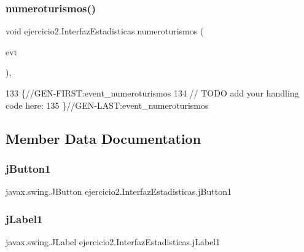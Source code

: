 \subsubsection{\texorpdfstring{numeroturismos()}{numeroturismos()}}
{\footnotesize\ttfamily void ejercicio2.\+Interfaz\+Estadisticas.\+numeroturismos (\begin{DoxyParamCaption}\item[{javax.\+swing.\+event.\+Ancestor\+Event}]{evt }\end{DoxyParamCaption})\hspace{0.3cm}{\ttfamily [inline]}, {\ttfamily [private]}}


\begin{DoxyCode}
133                                                                      \{\textcolor{comment}{//GEN-FIRST:event\_numeroturismos}
134         \textcolor{comment}{// TODO add your handling code here:}
135     \}\textcolor{comment}{//GEN-LAST:event\_numeroturismos}
\end{DoxyCode}


\subsection{Member Data Documentation}
\mbox{\label{classejercicio2_1_1_interfaz_estadisticas_a2e04a5a0eb4f298d827c33c859436a97}} 
\subsubsection{\texorpdfstring{j\+Button1}{jButton1}}
{\footnotesize\ttfamily javax.\+swing.\+J\+Button ejercicio2.\+Interfaz\+Estadisticas.\+j\+Button1\hspace{0.3cm}{\ttfamily [private]}}

\mbox{\label{classejercicio2_1_1_interfaz_estadisticas_a5e051aa4c804a5eb48e3f047abce704c}} 
\subsubsection{\texorpdfstring{j\+Label1}{jLabel1}}
{\footnotesize\ttfamily javax.\+swing.\+J\+Label ejercicio2.\+Interfaz\+Estadisticas.\+j\+Label1\hspace{0.3cm}{\ttfamily [private]}}

